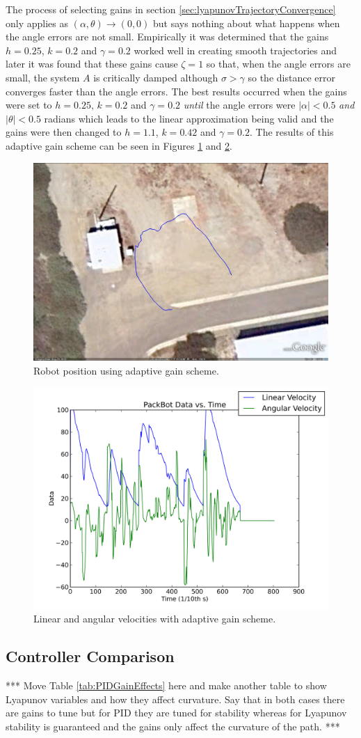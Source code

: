 The process of selecting gains in section \ref{sec:lyapunovTrajectoryConvergence} only applies as $(\alpha, \theta)\to(0,0)$ but says nothing about what happens when the angle errors are not small. Empirically it was determined that the gains $h=0.25$, $k=0.2$ and $\gamma=0.2$ worked well in creating smooth trajectories and later it was found that these gains cause $\zeta=1$ so that, when the angle errors are small, the system $A$ is critically damped although $\sigma>\gamma$ so the distance error converges faster than the angle errors. The best results occurred when the gains were set to $h=0.25$, $k=0.2$ and $\gamma=0.2$ \textit{until} the angle errors were $|\alpha|<0.5$ \textit{and} $|\theta|<0.5$ radians which leads to the linear approximation being valid and the gains were then changed to $h=1.1$, $k=0.42$ and $\gamma=0.2$. The results of this adaptive gain scheme can be seen in Figures \ref{fig:resultsLyapunovPositionAdaptive} and \ref{fig:resultsLyapunovVelocitiesAdaptive}.

\begin{figure}[ht!]
	\centering
	\includegraphics[width=.5\textwidth]{images/20100929_1448_GE_KF}
	\caption{Robot position using adaptive gain scheme.}
	\label{fig:resultsLyapunovPositionAdaptive}
\end{figure}

\begin{figure}[ht!]
	\centering
	\includegraphics[width=.5\textwidth]{images/20100929_1448_pbtx}
	\caption{Linear and angular velocities with adaptive gain scheme.}
	\label{fig:resultsLyapunovVelocitiesAdaptive}
\end{figure}

\subsection{Controller Comparison}
\label{sec:controllerComparison}
*** Move Table \ref{tab:PIDGainEffects} here and make another table to show Lyapunov variables and how they affect curvature. Say that in both cases there are gains to tune but for PID they are tuned for stability whereas for Lyapunov stability is guaranteed and the gains only affect the curvature of the path. ***

